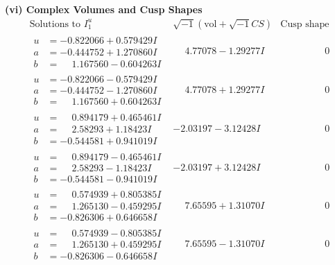 \documentclass[1p]{elsarticle_modified}
\theoremstyle{definition}
\newcommand{\I}{\sqrt{-1}}
\begin{document}
\newpage\flushleft \textbf{(vi) Complex Volumes and Cusp Shapes}
$$\begin{array}{c|c|c}  
\text{Solutions to }I^u_{1}& \I (\text{vol} + \sqrt{-1}CS) & \text{Cusp shape}\\
 \hline 
\begin{aligned}
u &= -0.822066 + 0.579429 I \\
a &= -0.444752 + 1.270860 I \\
b &= \phantom{-}1.167560 - 0.604263 I\end{aligned}
 & \phantom{-}4.77078 - 1.29277 I & \phantom{-0.000000 } 0 \\ \hline\begin{aligned}
u &= -0.822066 - 0.579429 I \\
a &= -0.444752 - 1.270860 I \\
b &= \phantom{-}1.167560 + 0.604263 I\end{aligned}
 & \phantom{-}4.77078 + 1.29277 I & \phantom{-0.000000 } 0 \\ \hline\begin{aligned}
u &= \phantom{-}0.894179 + 0.465461 I \\
a &= \phantom{-}2.58293 + 1.18423 I \\
b &= -0.544581 + 0.941019 I\end{aligned}
 & -2.03197 - 3.12428 I & \phantom{-0.000000 } 0 \\ \hline\begin{aligned}
u &= \phantom{-}0.894179 - 0.465461 I \\
a &= \phantom{-}2.58293 - 1.18423 I \\
b &= -0.544581 - 0.941019 I\end{aligned}
 & -2.03197 + 3.12428 I & \phantom{-0.000000 } 0 \\ \hline\begin{aligned}
u &= \phantom{-}0.574939 + 0.805385 I \\
a &= \phantom{-}1.265130 - 0.459295 I \\
b &= -0.826306 + 0.646658 I\end{aligned}
 & \phantom{-}7.65595 + 1.31070 I & \phantom{-0.000000 } 0 \\ \hline\begin{aligned}
u &= \phantom{-}0.574939 - 0.805385 I \\
a &= \phantom{-}1.265130 + 0.459295 I \\
b &= -0.826306 - 0.646658 I\end{aligned}
 & \phantom{-}7.65595 - 1.31070 I & \phantom{-0.000000 } 0 \\ \hline\begin{aligned}

\end{aligned}
\end{array}$$
\end{document}
